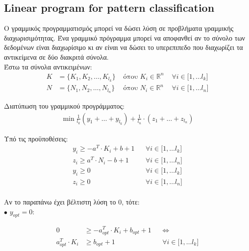 \documentclass[12pt]{article}
\newcommand{\R}{\mathbb{R}}
\newcommand{\margin}{\hspace{4pt}}
\newcommand{\centered}[1]{\begin{align*}#1\end{align*}}
\begin{document}
\subsection{Linear program for pattern classification}

Ο γραμμικός προγραμματισμός μπορεί να δώσει λύση σε προβλήματα γραμμικής διαχωρισιμότητας. Ένα γραμμικό πρόγραμμα μπορεί να αποφανθεί αν το σύνολο των δεδομένων είναι διαχωρίσιμο κι αν είναι να δώσει το υπερεπιπεδο που διαχωρίζει τα αντικείμενα σε δύο διακριτά σύνολα. \\

Έστω τα σύνολα αντικειμένων: \\

\begin{align*}
K & = \{K_{1}, K_{2}, \dotsc , K_{l_k}\} & \text{ όπου }  K_i \in \R^{n} & \margin \forall i \in \lbrack 1, \dotsc l_k \rbrack \\
N & = \{N_{1}, N_{2}, \dotsc , N_{l_n}\} & \text{ όπου }  N_i \in \R^{n} & \margin \forall i \in \lbrack 1, \dotsc l_n \rbrack
\end{align*}

Διατύπωση του γραμμικού προγράμματος: \\

\centered{ \min \frac{1}{l_{k}} \left( y_{1} + \dotsc + y_{l_{k}} \right) + \frac{1}{l_{n}} \cdot \left( z_{1} + \dotsc + z_{l_{n}} \right) }

Υπό τις προϋποθέσεις: \\

\begin{align*}
y_{i} \geq -a^{T} \cdot K_{i} + b + 1 && \forall i \in \lbrack 1, \dotsc l_k \rbrack \\
z_{i} \geq a^{T} \cdot N_{i} - b + 1 && \forall i \in \lbrack 1, \dotsc l_n \rbrack \\
y_{i} \geq 0 && \forall i \in \lbrack 1, \dotsc l_k \rbrack \\
z_{i} \geq 0 && \forall i \in \lbrack 1, \dotsc l_n \rbrack \\
\end{align*} 


Αν το παραπάνω έχει βέλτιστη λύση το 0, τότε: \\

\( \bullet \) \(y_{opt} = 0\):

\begin{align*}
0 & \geq -a^{T}_{opt} \cdot K_{i} + b_{opt} + 1 && \Leftrightarrow \\ 
a^{T}_{opt} \cdot K_{i} & \geq b_{opt} + 1 && \forall i \in \lbrack 1, \dotsc l_k \rbrack
\end{align*} 
\end{document}
